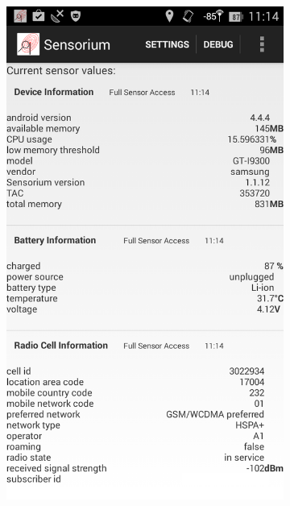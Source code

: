 \begin{figure}[htb]
	\centering
	\begin{subfigure}[b]{0.45\textwidth}
		\includegraphics[width=\textwidth]{images/sensorium.png}
	\end{subfigure}%
	\hfill
	\begin{subfigure}[b]{0.45\textwidth}

\end{subfigure}
\end{figure}
